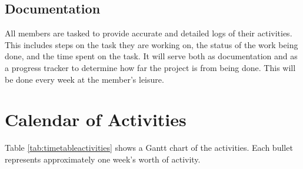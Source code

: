 \subsection{Documentation}
All members are tasked to provide accurate and detailed logs of their activities.
This includes steps on the task they are working on, the status of the work being done, and the time spent on the task.
It will serve both as documentation and as a progress tracker to determine how far the project is from being done.
This will be done every week at the member’s leisure.


\section{Calendar of Activities}

	Table \ref{tab:timetableactivities} shows a Gantt chart of the activities.  Each bullet represents approximately
	one week's worth of activity.
	
	\newcommand{\weekone}{\textbullet}
	\newcommand{\weektwo}{\textbullet \textbullet}
	\newcommand{\weekthree}{\textbullet \textbullet \textbullet}
	\newcommand{\weekfour}{\textbullet \textbullet \textbullet \textbullet}
	

